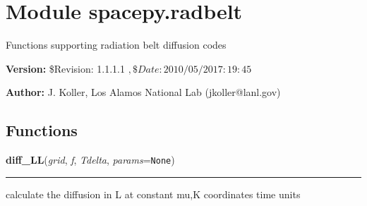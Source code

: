 %
%
%


\section{Module spacepy.radbelt}

    \label{spacepy:radbelt}
Functions supporting radiation belt diffusion codes

\textbf{Version:} \$Revision: 1.1.1.1 $, \$Date: 2010/05/20 17:19:45 $



\textbf{Author:} J. Koller, Los Alamos National Lab (jkoller@lanl.gov)





  \subsection{Functions}

    \label{spacepy:radbelt:diff_LL}

    \vspace{0.5ex}

\hspace{.8\funcindent}\begin{boxedminipage}{\funcwidth}

    \raggedright \textbf{diff\_LL}(\textit{grid}, \textit{f}, \textit{Tdelta}, \textit{params}={\tt None})

    \vspace{-1.5ex}

    \rule{\textwidth}{0.5\fboxrule}
\setlength{\parskip}{2ex}
    calculate the diffusion in L at constant mu,K coordinates time units

\setlength{\parskip}{1ex}
    \end{boxedminipage}

